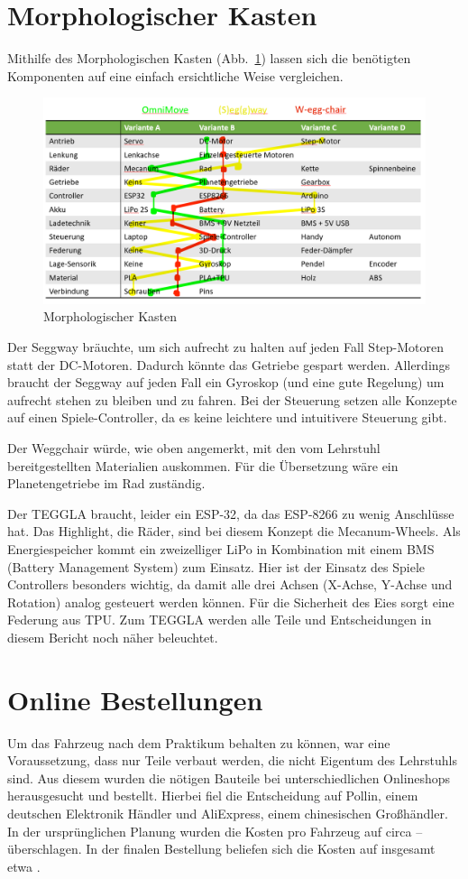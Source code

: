 \section{Morphologischer Kasten}
Mithilfe des Morphologischen Kasten (Abb.~\ref{bild:morphkasten}) lassen sich die benötigten Komponenten auf eine einfach ersichtliche Weise vergleichen.
\begin{figure}[H]
	\centering
	\includegraphics[width=\textwidth]{bilder/morphkasten.png}
	\caption{Morphologischer Kasten}
	\label{bild:morphkasten}
\end{figure}
Der Seggway bräuchte, um sich aufrecht zu halten auf jeden Fall Step-Motoren statt der DC-Motoren. Dadurch könnte das Getriebe gespart werden. Allerdings braucht der Seggway auf jeden Fall ein Gyroskop (und eine gute Regelung) um aufrecht stehen zu bleiben und zu fahren. Bei der Steuerung setzen alle Konzepte auf einen Spiele-Controller, da es keine leichtere und intuitivere Steuerung gibt.

Der Weggchair würde, wie oben angemerkt, mit den vom Lehrstuhl bereitgestellten Materialien auskommen. Für die Übersetzung wäre ein Planetengetriebe im Rad zuständig. 

Der TEGGLA braucht, leider ein ESP-32, da das ESP-8266 zu wenig Anschlüsse hat. Das Highlight, die Räder, sind bei diesem Konzept die Mecanum-Wheels. Als Energiespeicher kommt ein zweizelliger LiPo in Kombination mit einem BMS (Battery Management System) zum Einsatz. Hier ist der Einsatz des Spiele Controllers besonders wichtig, da damit alle drei Achsen (X-Achse, Y-Achse und Rotation) analog gesteuert werden können. Für die Sicherheit des Eies sorgt eine Federung aus TPU. Zum TEGGLA werden alle Teile und Entscheidungen in diesem Bericht noch näher beleuchtet. 



\section{Online Bestellungen}
Um das Fahrzeug nach dem Praktikum behalten zu können, war eine Voraussetzung, dass nur Teile verbaut werden, die nicht Eigentum des Lehrstuhls sind.
Aus diesem wurden die nötigen Bauteile bei unterschiedlichen Onlineshops herausgesucht und bestellt.
Hierbei fiel die Entscheidung auf Pollin, einem deutschen Elektronik Händler und AliExpress, einem chinesischen Großhändler.
In der ursprünglichen Planung wurden die Kosten pro Fahrzeug auf circa  --  überschlagen.
In der finalen Bestellung beliefen sich die Kosten auf insgesamt etwa .

